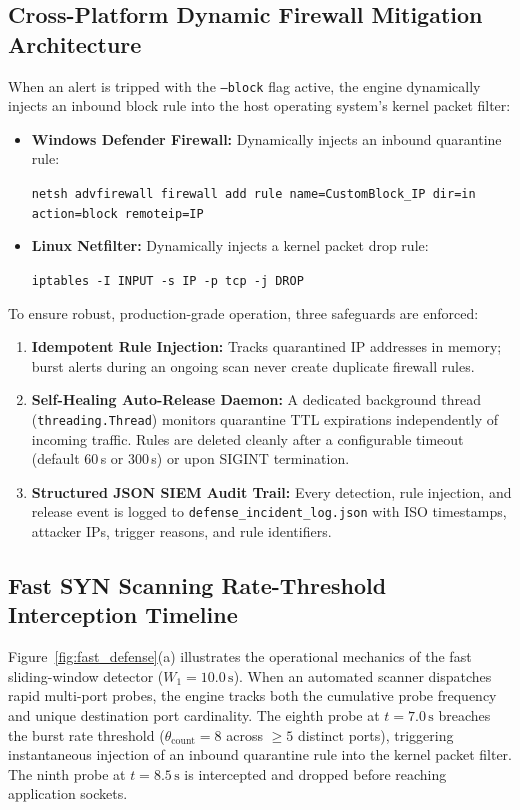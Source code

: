 \subsection{Cross-Platform Dynamic Firewall Mitigation Architecture}
When an alert is tripped with the \texttt{--block} flag active, the engine dynamically injects an
inbound block rule into the host operating system's kernel packet filter:
\begin{itemize}
    \item \textbf{Windows Defender Firewall:} Dynamically injects an inbound quarantine rule:
    \begin{center}
    \small\texttt{netsh advfirewall firewall add rule name=CustomBlock\_IP dir=in action=block remoteip=IP}
    \end{center}
    \item \textbf{Linux Netfilter:} Dynamically injects a kernel packet drop rule:
    \begin{center}
    \small\texttt{iptables -I INPUT -s IP -p tcp -j DROP}
    \end{center}
\end{itemize}
To ensure robust, production-grade operation, three safeguards are enforced:
\begin{enumerate}
    \item \textbf{Idempotent Rule Injection:} Tracks quarantined IP addresses in memory; burst alerts
    during an ongoing scan never create duplicate firewall rules.
    \item \textbf{Self-Healing Auto-Release Daemon:} A dedicated background thread (\texttt{threading.Thread})
    monitors quarantine TTL expirations independently of incoming traffic. Rules are deleted cleanly
    after a configurable timeout (default 60\,s or 300\,s) or upon SIGINT termination.
    \item \textbf{Structured JSON SIEM Audit Trail:} Every detection, rule injection, and release event
    is logged to \texttt{defense\_incident\_log.json} with ISO timestamps, attacker IPs, trigger
    reasons, and rule identifiers.
\end{enumerate}

\subsection{Fast SYN Scanning Rate-Threshold Interception Timeline}
Figure~\ref{fig:fast_defense}(a) illustrates the operational mechanics of the fast sliding-window detector ($W_1 = 10.0\,\text{s}$). When an automated scanner dispatches rapid multi-port probes, the engine tracks both the cumulative probe frequency and unique destination port cardinality. The eighth probe at $t=7.0\,\text{s}$ breaches the burst rate threshold ($\theta_{\text{count}} = 8$ across $\ge 5$ distinct ports), triggering instantaneous injection of an inbound quarantine rule into the kernel packet filter. The ninth probe at $t=8.5\,\text{s}$ is intercepted and dropped before reaching application sockets.

